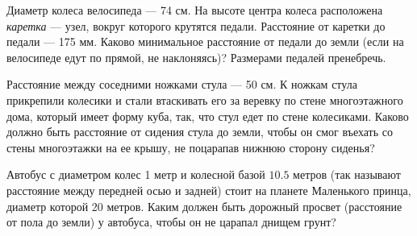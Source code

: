 ﻿
\begin{enumerate}

\itA Диаметр колеса велосипеда — 74 см. На высоте центра колеса расположена {\itshape каретка} — узел, вокруг которого крутятся педали. Расстояние от каретки до педали — 175 мм. Каково минимальное расстояние от педали до земли (если на велосипеде едут по прямой, не наклоняясь)? Размерами педалей пренебречь.

\itB Расстояние между соседними ножками стула — 50 см. К ножкам стула прикрепили колесики и стали втаскивать его за веревку по стене многоэтажного дома, который имеет форму куба, так, что стул едет по стене колесиками. Каково должно быть расстояние от сидения стула до земли, чтобы он смог въехать со стены многоэтажки на ее крышу, не поцарапав нижнюю сторону сиденья?

\itC Автобус с диаметром колес 1 метр и колесной базой $10.5$ метров (так называют расстояние между передней осью и задней) стоит на планете Маленького принца, диаметр которой 20 метров. Каким должен быть дорожный просвет (расстояние от пола до земли) у автобуса, чтобы он не царапал днищем грунт?
\end{enumerate}